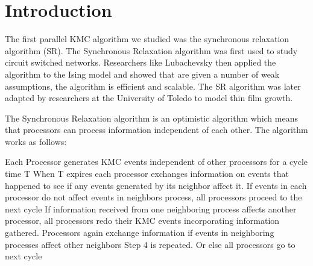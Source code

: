 
\section{Introduction}
The first parallel KMC algorithm we studied was the synchronous relaxation algorithm (SR). The Synchronous Relaxation algorithm was first used to study circuit switched networks. Researchers like Lubachevsky then applied the algorithm to the Ising model and showed that are given a number of weak assumptions, the algorithm is efficient and scalable. The SR algorithm was later adapted by researchers at the University of Toledo to model thin film growth.

The Synchronous Relaxation algorithm is an optimistic algorithm which means that processors can process information independent of each other.
The algorithm works as follows:
\begin{description}
 Each Processor generates KMC events independent of other processors for a cycle time T
 When T expires each processor exchanges information on events that happened to see if any events generated by its neighbor affect it.
 If events in each processor do not affect events in neighbors process, all  processors proceed to the next cycle
 If information received from one neighboring process affects another processor, all processors redo their KMC events incorporating  information gathered.
 Processors again exchange information if events in neighboring processes affect other neighbors Step 4 is repeated. Or else all processors go to next cycle
\end{description}~\cite{ae:kmc}

